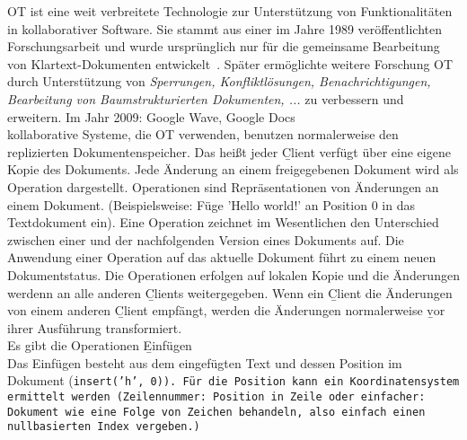     \gls{OT} ist eine weit verbreitete Technologie zur Unterstützung von Funktionalitäten in \gls{kollaborativ}er Software. Sie stammt aus einer im Jahre 1989 veröffentlichten Forschungsarbeit und wurde ursprünglich nur für die gemeinsame Bearbeitung von Klartext-Dokumenten entwickelt~\cite{ot_paper}. Später ermöglichte weitere Forschung \gls{OT} durch Unterstützung von \textit{Sperrungen, Konfliktlösungen, Benachrichtigungen, Bearbeitung von Baumstrukturierten Dokumenten, ...} zu verbessern und erweitern. Im Jahr 2009: Google Wave, Google Docs\\
      \Gls{kollaborativ}e Systeme, die \gls{OT} verwenden, benutzen normalerweise den replizierten Dokumentenspeicher. Das heißt jeder \b{Client} verfügt über eine eigene Kopie des Dokuments.
      Jede Änderung an einem freigegebenen Dokument wird als Operation dargestellt. Operationen sind Repräsentationen von Änderungen an einem Dokument. (Beispielsweise: Füge 'Hello world!' an Position 0 in das Textdokument ein).  Eine Operation zeichnet im Wesentlichen den Unterschied zwischen einer und der nachfolgenden Version eines Dokuments auf. Die Anwendung einer Operation auf das aktuelle Dokument führt zu einem neuen Dokumentstatus.
      Die Operationen erfolgen auf lokalen Kopie und die Änderungen werdenn an alle anderen \b{Clients} weitergegeben.  Wenn ein \b{Client} die Änderungen von einem anderen \b{Client} empfängt, werden die Änderungen normalerweise \b{vor} ihrer Ausführung transformiert.
      \\
      Es gibt die Operationen \b{Einfügen}\\
      Das Einfügen besteht aus dem eingefügten Text und dessen Position im Dokument (\tt{insert('h', 0)}).
      Für die Position kann ein Koordinatensystem ermittelt werden (Zeilennummer: Position in Zeile oder einfacher: Dokument wie eine Folge von Zeichen behandeln, also einfach einen nullbasierten Index vergeben.)\\
